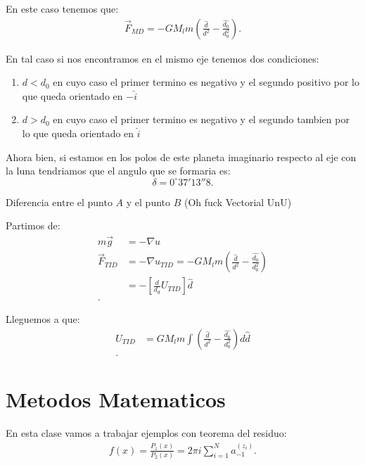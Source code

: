 \documentclass{report}
\begin{document}
  En este caso tenemos que:
  \begin{align*}
    \Vec{F}_{MD} = -GM_l m\left( \frac{\hat{d}}{d^2} - \frac{\hat{d_0}}{d_0^2} \right)
  .\end{align*}

  En tal caso si nos encontramos en el mismo eje tenemos dos condiciones:
  \begin{enumerate}
    \item $d<d_0$ en cuyo caso el primer termino es negativo y el segundo positivo por lo que queda orientado en $-\hat{i}$
    \item $d>d_0$ en cuyo caso el primer termino es negativo y el segundo tambien por lo que queda orientado en $\hat{i}$
  \end{enumerate}

  Ahora bien, si estamos en los polos de este planeta imaginario respecto al eje con la luna tendriamos que el angulo que se formaria es: \[
  \delta = 0^\circ 37' 13''8
  .\]

  Diferencia entre el punto $A$ y el punto $B$
  (Oh fuck Vectorial UnU)

  Partimos de:
  \begin{align*}
    m\Vec{g} &= -\nabla u \\
    \Vec{F}_{TID} &= -\nabla u_{TID} = -GM_l m\left( \frac{\hat{d}}{d^2}-\frac{\hat{d_0}}{d_0^2} \right)  \\
		  &= -\left[ \frac{d}{d_{d}}U_{TID} \right]\hat{d}  \\
  .\end{align*}

  Lleguemos a que:
  \begin{align*}
    U_{TID}&=GM_l m \int\left( \frac{\hat{d}}{d^2}-\frac{\hat{d_0}}{d_0^2} \right) d\hat{d}\\
  .\end{align*}

  \section{Metodos Matematicos}

  En esta clase vamos a trabajar ejemplos con teorema del residuo:
  \begin{align*}
    f\left( x \right) = \frac{P_1\left( x \right) }{P_2\left( x \right) } = 2\pi i \sum_{i=1}^{N} a_{-1}^{\left( z_i \right) }
  .\end{align*}
\end{document}
